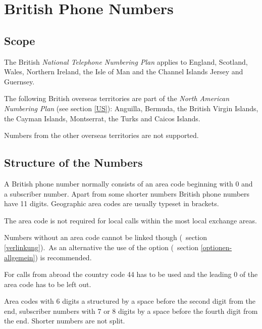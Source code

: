 \documentclass[numbers=noenddot]{scrreprt}
\newcommand\UeberschriftGeltungsbereich{\section{Scope}}
\newcommand\UeberschriftAufbau{\section{Structure of the Numbers}}
\newcommand\KeineVerlinkung{Numbers without an area code cannot be linked though
\vglAbschnitt{verlinkung}.}
\newcommand*\vglAbschnitt[1]{(\cf\ section \ref{#1})}
\newcommand*\sieheAbschnitt[1]{(see section \ref{#1})}
\newcommand*\AufbauDEATD[1]{For calls from abroad the country code #1 has to be used and the leading 0 of the area code has to be left out.}
\begin{document}
\chapter{British Phone Numbers}
\nocite{wikipedia-UK}
\nocite{wikipedia-UK-history}
\nocite{wikipedia-conventions}
\edef\myindent{\the\parindent}
\begin{minipage}{12cm}\setlength{\parindent}{\myindent}
\UeberschriftGeltungsbereich
The British \emph{National Telephone Numbering Plan}
\cite{Ofcom-plan}
applies to England, Scotland, Wales, Northern Ireland, the Isle of Man and the Channel Islands Jersey and Guernsey.

The following British overseas territories are part of the \emph{North American Numbering Plan}
\sieheAbschnitt{US}: Anguilla, Bermuda, the British Virgin Islands, the Cayman Islands, Montserrat, the Turks and Caicos Islands.

Numbers from the other overseas territories are not supported.
\end{minipage}
\hfill
{}

\UeberschriftAufbau
A British phone number normally consists of an area code beginning with 0 and a subscriber number. Apart from some shorter numbers British phone numbers have 11 digits. Geographic area codes are usually typeset in brackets.
\begin{sidebyside}
\end{sidebyside}

The area code is not required for local calls within the most local exchange areas.
\begin{sidebyside}
\end{sidebyside}
\KeineVerlinkung\ As an alternative the use of the  option
\vglAbschnitt{optionen-allgemein} is recommended.

\AufbauDEATD{44}
\begin{sidebyside}
\end{sidebyside}

Area codes with 6 digits a structured by a space before the second digit from the end, subscriber numbers with 7 or 8 digits by a space before the fourth digit from the end. Shorter numbers are not split.
\begin{sidebyside}
   \\
   \\
\end{sidebyside}
\end{document}
